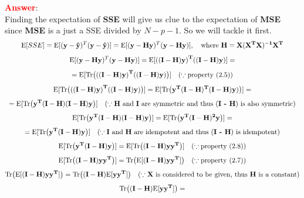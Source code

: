 \documentclass{homework}
\begin{document}
    \textbf{\textcolor{red}{Answer}}: \\
    Finding the expectation of \textbf{SSE} will give us clue to the expectation of \textbf{MSE} since \textbf{MSE} is a just a SSE divided by $N-p-1$. So we will tackle it first.
    \begin{equation*}
    \begin{gathered}
        \text{E}[SSE] =  \text{E}[\mathbf{(y-\hat{y}})^T(\mathbf{y-\hat{y})}] = 
        \text{E}[\mathbf{(y-Hy})^T(\mathbf{y-Hy)}], \quad \text{where\ } \mathbf{H} = \mathbf{X(X^TX)^{-1}X^T} \\[4pt]
        \text{E}[\mathbf{(y-Hy})^T(\mathbf{y-Hy)}] = 
        \text{E}[\mathbf{\left((I-H)y\right)^T}\mathbf{\left((I-H)y\right)}] = \\[4pt]
        = \text{E}[\text{Tr}\big (\mathbf{\left((I-H)y\right)^T}\mathbf{\left((I-H)y\right)}\big)] \quad (\because \text{property (2.5)}) \\[4pt]
        \text{E}[\text{Tr}\big (\mathbf{\left((I-H)y\right)^T}\mathbf{\left((I-H)y\right)}\big)] = \text{E}[\text{Tr}\big (\mathbf{y^T(I-H)^T}\mathbf{(I-H)y)}\big)] = \\[4pt]
        = \text{E}[\text{Tr}\big (\mathbf{y^T(I-H)}\mathbf{(I-H)y}\big)] 
        \quad (\because \text{\textbf{H} and \textbf{I} are symmetric and thus (\textbf{I - H}) is also symmetric}) \\[4pt]
        \text{E}[\text{Tr}\big (\mathbf{y^T(I-H)}\mathbf{(I-H)y}\big)] = 
        \text{E}[\text{Tr}\big (\mathbf{y^T(I-H)^2y}\big)] = \\[4pt]
        = \text{E}[\text{Tr}\big (\mathbf{y^T(I-H)y}\big)] 
        \quad   (\because \text{\textbf{I} and \textbf{H} are idempotent and thus (\textbf{I - H}) is idempotent}) \\[4pt]
        \text{E}[\text{Tr}\big (\mathbf{y^T(I-H)y}\big)] = 
        \text{E}[\text{Tr}\big (\mathbf{(I-H)yy^T}\big)] 
        \quad (\because \text{property (2.8)}) \\[4pt]
        \text{E}[\text{Tr}\big (\mathbf{(I-H)yy^T}\big)] =
        \text{Tr}\big (\text{E}[\mathbf{(I-H)yy^T}]\big) 
        \quad (\because \text{property (2.7)}) \\[4pt]
        \text{Tr}\big (\text{E}[\mathbf{(I-H)yy^T}]\big) = 
        \text{Tr}\big (\mathbf{(I-H)}\text{E}[\mathbf{yy^T}]\big)
        \quad (\because \text{\textbf{X} is considered to be given, thus \textbf{H} is a constant}) \\[4pt]
        \text{Tr}\big (\mathbf{(I-H)}\text{E}[\mathbf{yy^T}]\big) = 

\end{gathered}
\end{equation*}
\end{document}
